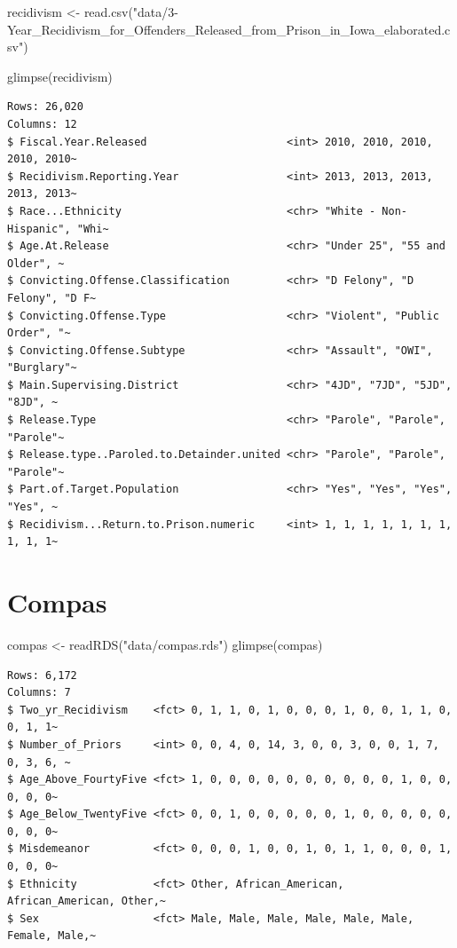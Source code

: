 \documentclass[
  letterpaper,
  DIV=11,
  numbers=noendperiod]{scrreprt}
\newenvironment{Shaded}{\begin{snugshade}}{\end{snugshade}}
\newcommand{\FunctionTok}[1]{\textcolor[rgb]{0.28,0.35,0.67}{#1}}
\newcommand{\NormalTok}[1]{\textcolor[rgb]{0.00,0.23,0.31}{#1}}
\newcommand{\OtherTok}[1]{\textcolor[rgb]{0.00,0.23,0.31}{#1}}
\newcommand{\StringTok}[1]{\textcolor[rgb]{0.13,0.47,0.30}{#1}}
\theoremstyle{definition}
\theoremstyle{remark}
\begin{document}
\begin{Shaded}
\begin{Highlighting}[]
\NormalTok{recidivism }\OtherTok{\textless{}{-}} \FunctionTok{read.csv}\NormalTok{(}\StringTok{"data/3{-}Year\_Recidivism\_for\_Offenders\_Released\_from\_Prison\_in\_Iowa\_elaborated.csv"}\NormalTok{)}

\FunctionTok{glimpse}\NormalTok{(recidivism)}
\end{Highlighting}
\end{Shaded}

\begin{verbatim}
Rows: 26,020
Columns: 12
$ Fiscal.Year.Released                      <int> 2010, 2010, 2010, 2010, 2010~
$ Recidivism.Reporting.Year                 <int> 2013, 2013, 2013, 2013, 2013~
$ Race...Ethnicity                          <chr> "White - Non-Hispanic", "Whi~
$ Age.At.Release                            <chr> "Under 25", "55 and Older", ~
$ Convicting.Offense.Classification         <chr> "D Felony", "D Felony", "D F~
$ Convicting.Offense.Type                   <chr> "Violent", "Public Order", "~
$ Convicting.Offense.Subtype                <chr> "Assault", "OWI", "Burglary"~
$ Main.Supervising.District                 <chr> "4JD", "7JD", "5JD", "8JD", ~
$ Release.Type                              <chr> "Parole", "Parole", "Parole"~
$ Release.type..Paroled.to.Detainder.united <chr> "Parole", "Parole", "Parole"~
$ Part.of.Target.Population                 <chr> "Yes", "Yes", "Yes", "Yes", ~
$ Recidivism...Return.to.Prison.numeric     <int> 1, 1, 1, 1, 1, 1, 1, 1, 1, 1~
\end{verbatim}

\hypertarget{compas}{%
\section{Compas}\label{compas}}

\begin{Shaded}
\begin{Highlighting}[]
\NormalTok{compas }\OtherTok{\textless{}{-}} \FunctionTok{readRDS}\NormalTok{(}\StringTok{"data/compas.rds"}\NormalTok{)}
\FunctionTok{glimpse}\NormalTok{(compas)}
\end{Highlighting}
\end{Shaded}

\begin{verbatim}
Rows: 6,172
Columns: 7
$ Two_yr_Recidivism    <fct> 0, 1, 1, 0, 1, 0, 0, 0, 1, 0, 0, 1, 1, 0, 0, 1, 1~
$ Number_of_Priors     <int> 0, 0, 4, 0, 14, 3, 0, 0, 3, 0, 0, 1, 7, 0, 3, 6, ~
$ Age_Above_FourtyFive <fct> 1, 0, 0, 0, 0, 0, 0, 0, 0, 0, 0, 1, 0, 0, 0, 0, 0~
$ Age_Below_TwentyFive <fct> 0, 0, 1, 0, 0, 0, 0, 0, 1, 0, 0, 0, 0, 0, 0, 0, 0~
$ Misdemeanor          <fct> 0, 0, 0, 1, 0, 0, 1, 0, 1, 1, 0, 0, 0, 1, 0, 0, 0~
$ Ethnicity            <fct> Other, African_American, African_American, Other,~
$ Sex                  <fct> Male, Male, Male, Male, Male, Male, Female, Male,~
\end{verbatim}
\end{document}
